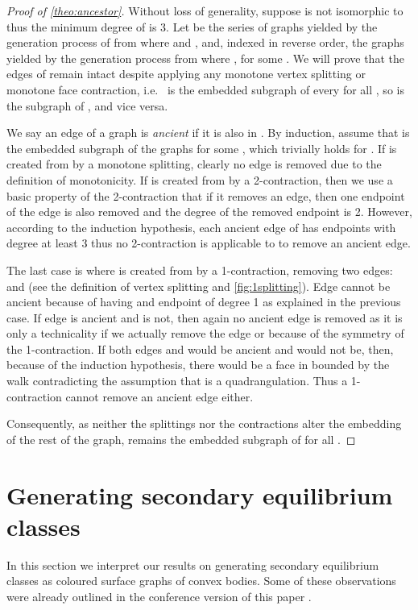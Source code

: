\documentclass[]{article}
\begin{document}
\begin{proof}[Proof of \autoref*{theo:ancestor}]
Without loss of generality, suppose  is not isomorphic to  thus the minimum degree of  is 3.
Let  be the series of graphs yielded by the generation process of  from  where  and , and, indexed in reverse order,  the graphs yielded by the generation process from  where , for some .
We will prove that the edges of  remain intact despite applying any monotone vertex splitting or monotone face contraction,
i.e.~ is the embedded subgraph of every  for all , so  is the subgraph of , and vice versa.

We say an edge of a graph  is \emph{ancient} if it is also in .
By induction, assume that  is the embedded subgraph of the graphs  for some , which trivially holds for .
If  is created from  by a monotone splitting, 
clearly no edge is removed due to the definition of monotonicity.
If  is created from  by a 2-contraction, then we use a basic property of the 2-contraction that if it removes an edge, then one endpoint of the edge is also removed and the degree of the removed endpoint is 2.
However, according to the induction hypothesis, each ancient edge of  has endpoints with degree at least 3 thus no 2-contraction is applicable to  to remove an ancient edge.

The last case is where  is created from  by a 1-contraction, removing two edges:  and  (see the definition of vertex splitting and \autoref{fig:1splitting}).
Edge  cannot be ancient because of having and endpoint of degree 1 as explained in the previous case.
If edge  is ancient and  is not, then again no ancient edge is removed as it is only a technicality if we actually remove the edge  or  because of the symmetry of the 1-contraction.
If both edges  and  would be ancient and  would not be, then, because of the induction hypothesis, there would be a face in  bounded by the walk  contradicting the assumption that  is a quadrangulation.
Thus a 1-contraction cannot remove an ancient edge either.

Consequently, as neither the splittings nor the contractions alter the embedding of the rest of the graph,  remains the embedded subgraph of  for all .
\end{proof}


\section{Generating secondary equilibrium classes}
\label{sec:geometry}

In this section we interpret our results on generating secondary equilibrium classes as coloured surface graphs of convex bodies.
Some of these observations were already outlined in the conference version of this paper \cite{Kapolnai2011}.
\end{document}
